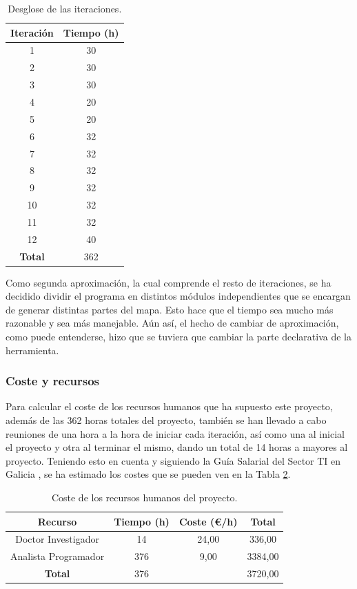\def\arraystretch{1}%

\begin{table}
	\centering
	\begin{tabular}{ c c }
		\bfseries{Iteración} & \bfseries{Tiempo (h)} \\
		\hline
		1 & 30 \\
		2 & 30 \\
		3 & 30 \\
		4 & 20 \\
		5 & 20 \\
		6 & 32 \\
		7 & 32 \\
		8 & 32 \\
		9 & 32 \\
		10 & 32 \\
		11 & 32 \\
		12 & 40 \\
		\hline
		\bfseries{Total} & 362 \\
		\hline
	\end{tabular}
	\caption{Desglose de las iteraciones.}\label{table:iteraciones}
\end{table}

Como segunda aproximación, la cual comprende el resto de iteraciones, se ha decidido dividir el programa en distintos módulos independientes que se encargan de generar distintas partes del mapa. Esto hace que el tiempo sea mucho más razonable y sea más manejable. Aún así, el hecho de cambiar de aproximación, como puede entenderse, hizo que se tuviera que cambiar la parte declarativa de la herramienta.

\subsubsection{Coste y recursos}

Para calcular el coste de los recursos humanos que ha supuesto este proyecto, además de las 362 horas totales del proyecto, también se han llevado a cabo reuniones de una hora a la hora de iniciar cada iteración, así como una al inicial el proyecto y otra al terminar el mismo, dando un total de 14 horas a mayores al proyecto. Teniendo esto en cuenta y siguiendo la Guía Salarial del Sector TI en Galicia \cite{guiasalarial}, se ha estimado los costes que se pueden ven en la Tabla \ref{table:costehumano}.

\begin{table}[!h]
	\centering
	\begin{tabular}{ c c c c }
		\bfseries{Recurso} & \bfseries{Tiempo (h)} & \bfseries{Coste (\euro/h)} & \bfseries{Total} \\
		\hline
		Doctor Investigador & 14 & 24,00 & 336,00 \\
		Analista Programador & 376 & 9,00 & 3384,00 \\
		\hline
		\bfseries{Total} & 376 & & 3720,00 \\
		\hline
	\end{tabular}
	\caption{Coste de los recursos humanos del proyecto.}\label{table:costehumano}
\end{table}

